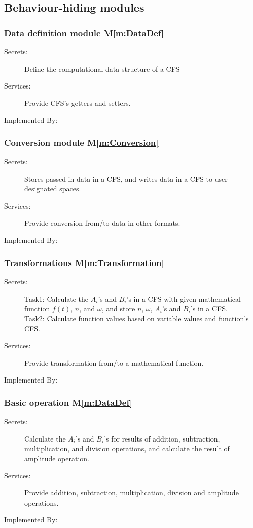 \documentclass[12pt, titlepage]{article}
\newcommand{\mref}[1]{M\ref{m:#1}}
\begin{document}
\subsection{Behaviour-hiding modules}
\subsubsection{Data definition module \mref{DataDef}}
\begin{description}
\item[Secrets:] Define the computational data structure of a CFS 
\item[Services:] Provide CFS's getters and setters.
\item[Implemented By:] \progname
\end{description}
\subsubsection{Conversion module \mref{Conversion}}
\begin{description}
	\item[Secrets:] Stores passed-in data in a CFS, and writes data in a CFS to user-designated spaces.
	\item[Services:] Provide conversion from/to data in other formats. 
	\item[Implemented By:] \progname
\end{description}
\subsubsection{Transformations \mref{Transformation}}
\begin{description}
	\item[Secrets:] Task1: Calculate the $A_i$'s and $B_i$'s in a CFS with given mathematical function $f(t)$, $n$, and $\omega$, and store $n$, $\omega$, $A_i$'s and $B_i$'s in a CFS. \\
	Task2: Calculate function values based on variable values and function's CFS.
	\item[Services:] Provide transformation from/to a mathematical function.
	\item[Implemented By:] \progname
\end{description}
\subsubsection{Basic operation \mref{DataDef}}
\begin{description}
	\item[Secrets:] Calculate the $A_i$'s and $B_i$'s for results of addition, subtraction, multiplication, and division operations, and calculate the result of amplitude operation. 
	\item[Services:] Provide addition, subtraction, multiplication, division and amplitude operations.
	\item[Implemented By:] \progname
\end{description}
\end{document}
